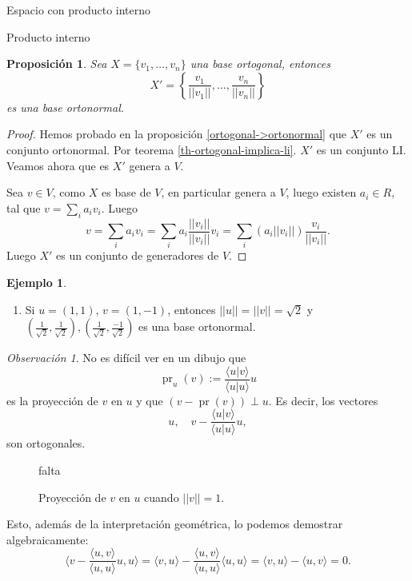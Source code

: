 \documentclass[a4paper,12pt,twoside,spanish]{amsbook}
\newtheorem{proposicion}[teorema]{Proposici\'on}
\theoremstyle{definition}
\newtheorem{ejemplo}{Ejemplo}[section]
\theoremstyle{remark}
\newtheorem{observacion}{Observaci\'on}[section]
\newcommand{\la}{\langle}
\newcommand{\ra}{\rangle}
\begin{document}
\begin{chapter}{Espacio con producto interno}
\begin{section}{Producto interno}
		\begin{proposicion} Sea $ X = \{v_1,\ldots,v_n\}$ una base ortogonal, entonces 
			\begin{equation*}
				X' = \left\{\frac{v_1}{||v_1||},\ldots,\frac{v_n}{||v_n||} \right\}
			\end{equation*}
			es una base ortonormal.
		\end{proposicion}
		\begin{proof}
			Hemos probado en la proposición \ref{ortogonal->ortonormal} que $X'$ es un conjunto ortonormal.  Por  teorema \ref{th-ortogonal-implica-li}. $X'$ es un conjunto LI.   Veamos ahora que es $X'$ genera a $V$. 
			
			Sea $v \in V$, como $X$  es base de  $V$, en particular genera a $V$, luego existen $a_i \in R$, tal que  $v = \sum_i a_i v_i$. Luego
			$$
			v = \sum_i a_i v_i = \sum_i a_i \frac{||v_i||}{||v_i||} v_i = \sum_i (a_i ||v_i||) \frac{v_i}{||v_i||}.
			$$
			Luego $X'$ es un conjunto de generadores de $V$. 
		\end{proof}
		\begin{ejemplo} 
			\begin{enumerate}
				\item Si $u=(1,1)$, $v=(1,-1)$, entonces $||u||=||v|| = \sqrt{2}$ y $(\frac{1}{\sqrt{2}},\frac{1}{\sqrt{2}}),(\frac{1}{\sqrt{2}},\frac{-1}{\sqrt{2}})$ es una base ortonormal.  
			\end{enumerate}
		\end{ejemplo}
		
		\medskip
		
		\begin{observacion}\label{obs-proyeccion-ort}
			No es difícil ver en un dibujo que 
			\begin{equation*}
				\operatorname{pr}_u(v) := \frac{\la u|v\ra}{\la u|u\ra}u
			\end{equation*}
			 es la proyección de $v$ en $u$ y que   $(v - \operatorname{pr}(v)) \perp u$. Es decir,   los vectores
			\begin{equation*}
					u, \quad   v - \frac{\la u|v\ra}{\la u|u\ra}u,
			\end{equation*}
			son ortogonales.
			\begin{figure}[h]
				falta
				\caption{Proyección de $v$ en $u$ cuando $||v||=1$.}\label{fig-proyeccion-ort}
			\end{figure}
		
		
			Esto,  además de la interpretación geométrica, lo podemos demostrar algebraicamente:
			\begin{equation*}
			\la v - \frac{\la u,v\ra}{\la u,u\ra} u , u \ra =
			\la v , u \ra  -\frac{\la u,v\ra}{\la u,u\ra}\la u , u \ra =  \la v , u \ra -  \la u , v \ra =0.
			\end{equation*}
			

\end{observacion}
\end{section}
\end{chapter}
\end{document}
